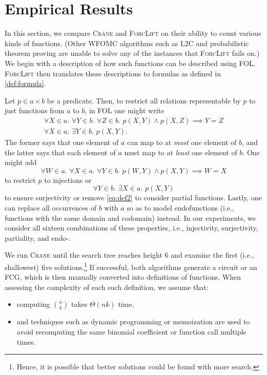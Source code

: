 \section{Empirical Results}\label{sec:results} %

In this section, we compare \textsc{Crane} and \textsc{ForcLift}
\citep{DBLP:conf/ijcai/BroeckTMDR11} on their ability to count various kinds of
functions. (Other WFOMC algorithms such as \textsc{L2C}
\citep{DBLP:conf/kr/KazemiP16} and probabilistic theorem proving
\citep{DBLP:journals/cacm/GogateD16} are unable to solve any of the instances
that \textsc{ForcLift} fails on.) We begin with a description of how such
functions can be described using FOL\@. \textsc{ForcLift} then translates these
descriptions to formulas as defined in \cref{def:formula}.

Let $p \in a \times b$ be a predicate. Then, to restrict all relations
representable by $p$ to just functions from $a$ to $b$, in FOL one might write
\begin{gather}
  \forall X \in a\text{. }\forall Y \in b\text{. }\forall Z \in b\text{. }p(X, Y) \land p(X, Z) \implies Y = Z\nonumber \\
  \forall X \in a\text{. }\exists Y \in b\text{. }p(X, Y). \label{eq:def2}
\end{gather}
The former says that one element of $a$ can map to at \emph{most} one element of
$b$, and the latter says that each element of $a$ must map to at \emph{least}
one element of $b$. One might add
\[
  \forall W \in a\text{. }\forall X \in a\text{. }\forall Y \in b\text{. }p(W, Y) \land p(X, Y) \implies W = X
\]
to restrict $p$ to injections or
\[
  \forall Y \in b\text{. }\exists X \in a\text{. }p(X, Y)
\]
to ensure surjectivity or remove \cref{eq:def2} to consider partial functions.
Lastly, one can replace all occurrences of $b$ with $a$ so as to model
endofunctions (i.e., functions with the same domain and codomain) instead. In
our experiments, we consider all sixteen combinations of these properties, i.e.,
injectivity, surjectivity, partiality, and endo-.

We run \textsc{Crane} until the search tree reaches height 6 and examine the
first (i.e., shallowest) five solutions.\footnote{Hence, it is possible that
  better solutions could be found with more search.} If successful, both
algorithms generate a circuit or an FCG, which is then manually converted into
definitions of functions. When assessing the complexity of each such definition,
we assume that:
\begin{itemize}
  \item computing $\binom{n}{k}$ takes $\Theta(nk)$ time,
  \item and techniques such as dynamic programming or memoization are used to
        avoid recomputing the same binomial coefficient or function call
        multiple times.
\end{itemize}

